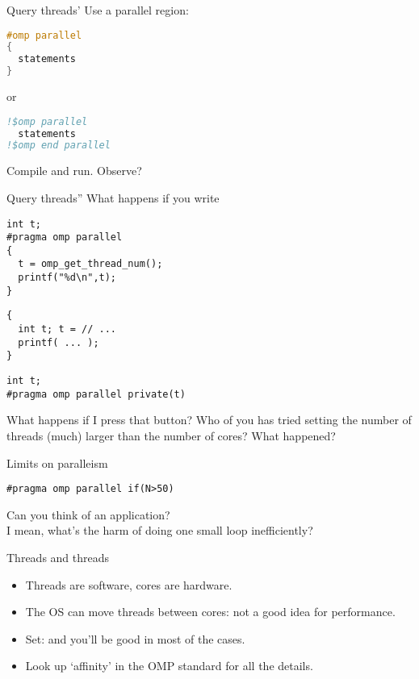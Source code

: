 \begin{numberedframe}{Query threads'}
Use a parallel region:
\begin{lstlisting}[language=C]
#omp parallel
{
  statements
}
\end{lstlisting}
or
\begin{lstlisting}[language=Fortran]
!$omp parallel
  statements
!$omp end parallel
\end{lstlisting}
Compile and run. Observe?
\end{numberedframe}

\begin{numberedframe}{Query threads''}
What happens if you write
\begin{lstlisting}
int t;
#pragma omp parallel
{
  t = omp_get_thread_num();
  printf("%d\n",t);
}
\end{lstlisting}
\begin{multicols}{2}
\begin{lstlisting}
{
  int t; t = // ...
  printf( ... );
}
\end{lstlisting}
\columnbreak
\begin{lstlisting}
int t;
#pragma omp parallel private(t)
\end{lstlisting}
\end{multicols}
\end{numberedframe}

\begin{exerciseframe}[parallel]
  
\end{exerciseframe}

\begin{exerciseframe}[parallel]
  
\end{exerciseframe}

\begin{numberedframe}{What happens if I press that button?}
  Who of you has tried setting the number of threads (much) larger
  than the number of cores? What happened?
\end{numberedframe}

\begin{numberedframe}{Limits on paralleism}
\begin{lstlisting}
#pragma omp parallel if(N>50)
\end{lstlisting}
Can you think of an application?\\
I mean, what's the harm of doing one small loop inefficiently?
\end{numberedframe}

\begin{numberedframe}{Threads and threads}
  \begin{itemize}    
  \item Threads are software, cores are hardware.
  \item The OS can move threads between cores: not a good idea for
    performance.
  \item Set:  and you'll be good in
    most of the cases.
  \item Look up `affinity' in the OMP standard for all the details.
  \end{itemize}
\end{numberedframe}

